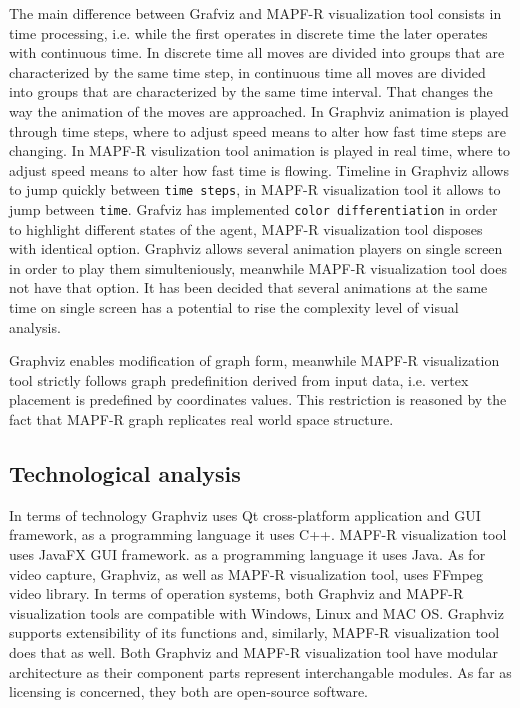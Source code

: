 \documentclass[thesis=B,english]{FITthesis}[2019/12/23]
\begin{document}
The main difference between Grafviz and MAPF-R visualization tool consists in time processing, i.e. while the first operates in discrete time the later operates with continuous time. In discrete time all moves are divided into groups that are characterized by the same time step, in continuous time all moves are divided into groups that are characterized by the same time interval. That changes the way the animation of the moves are approached. In Graphviz animation is played through time steps, where to adjust speed means to alter how fast time steps are changing. In MAPF-R visulization tool animation is played in real time, where to adjust speed means to alter how fast time is flowing. Timeline in Graphviz allows to jump quickly between \verb|time steps|, in MAPF-R visualization tool it allows to jump between \verb|time|. Grafviz has implemented \verb|color differentiation| in order to highlight different states of the agent, MAPF-R visualization tool disposes with identical option. Graphviz allows several animation players on single screen in order to play them simulteniously, meanwhile MAPF-R visualization tool does not have that option. It has been decided that several animations at the same time on single screen has a potential to rise the complexity level of visual analysis. 

Graphviz enables modification of graph form, meanwhile MAPF-R visualization tool strictly follows graph predefinition derived from input data, i.e. vertex placement is predefined by coordinates values. This restriction is reasoned by the fact that MAPF-R graph replicates real world space structure.


\subsection{Technological analysis}

In terms of technology Graphviz uses Qt cross-platform application and GUI framework, as a programming language it uses C++. MAPF-R visualization tool uses JavaFX GUI framework. as a programming language it uses Java. As for video capture, Graphviz, as well as MAPF-R visualization tool, uses FFmpeg video library. In terms of operation systems, both Graphviz and MAPF-R visualization tools are compatible with Windows, Linux and MAC OS. Graphviz supports extensibility of its functions and, similarly, MAPF-R visualization tool does that as well. Both Graphviz and MAPF-R visualization tool have modular architecture as their component parts represent interchangable modules. As far as licensing is concerned, they both are open-source software.
\end{document}
